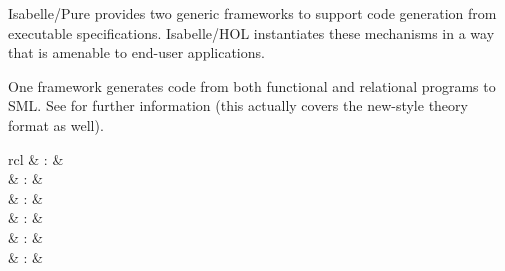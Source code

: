 \begin{isabellebody}
\begin{isamarkuptext}
\begin{description}
  \end{description}%
\end{isamarkuptext}%
\isamarkuptrue%
%
\isamarkuptrue%
%
\begin{isamarkuptext}%
Isabelle/Pure provides two generic frameworks to support code
  generation from executable specifications.  Isabelle/HOL
  instantiates these mechanisms in a way that is amenable to end-user
  applications.

  One framework generates code from both functional and relational
  programs to SML.  See \cite{isabelle-HOL} for further information
  (this actually covers the new-style theory format as well).

  \begin{matharray}{rcl}
    \hypertarget{command.HOL.value}{\hyperlink{command.HOL.value}{\mbox{}}}\isa{{\isachardoublequote}\isactrlsup {\isacharasterisk}{\isachardoublequote}} & : &  \\
    \hypertarget{command.HOL.code-module}{\hyperlink{command.HOL.code-module}{\mbox{}}} & : &  \\
    \hypertarget{command.HOL.code-library}{\hyperlink{command.HOL.code-library}{\mbox{}}} & : &  \\
    \hypertarget{command.HOL.consts-code}{\hyperlink{command.HOL.consts-code}{\mbox{}}} & : &  \\
    \hypertarget{command.HOL.types-code}{\hyperlink{command.HOL.types-code}{\mbox{}}} & : &  \\  
    \hypertarget{attribute.HOL.code}{\hyperlink{attribute.HOL.code}{\mbox{}}} & : &  \\
  \end{matharray}


\end{isamarkuptext}
\end{isabellebody}
